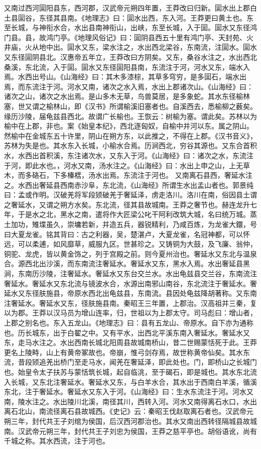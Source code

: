 \documentclass[12pt,UTF8]{ctexbook}
\begin{document}
又南过西河圁阳县东，西河郡，汉武帝元朔四年置，王莽改曰归新。圁水出上郡白土县圁谷，东径其县南。《地理志》曰：圁水出西，东入河。王莽更曰黄土也。东至长城，与神衔水合，水出县南神衔山，出峡，东至长城，入于圁。圁水又东径鸿门县。县，故鸿门亭。《地理风俗记》曰：圁阴县西五十里有鸿门亭、天封苑、火井庙，火从地中出。圁水又东，梁水注之，水出西北梁谷，东南流，注圁水。圁水又东径圁阴县北。汉惠帝五年立，王莽改曰方阴矣。又东，桑谷水注之，水出西北桑溪，东北流，入于圁。圁水又东径圁阳县南，东流注于河，河水又东，端水入焉。水西出号山。《山海经》曰：其木多漆棕，其草多穹穷，是多圁石，端水出焉，而东流注于河。河水又南，诸次之水入焉，水出上郡诸次山。《山海经》曰：诸次之山，诸次之水出焉。是山多木无草，鸟兽莫居，是多象蛇。其水东径榆林塞，世又谓之榆林山，即《汉书》所谓榆溪旧塞者也。自溪西去，悉榆柳之薮矣。缘历沙陵，届龟兹县西北。故谓广长榆也。王恢云：树榆为塞。谓此矣。苏林以为榆中在上郡，非也。案《始皇本纪》，西北逐匈奴，自榆中并河以东。属之阴山。然榆中在金城东五十许里，阴山在朔方东，以此推之，不得在上郡。《汉书音义》，苏林为失是也。其水东入长城，小榆水合焉。历涧西北，穷谷其源也。又东合首积水，水西出首积溪，东注诸次水，又东入于河。《山海经》曰：诸次之水，东流注于河，即此水也。，河水又南，汤水注之。《山海经》曰：水出上申之山，上无草木，而多硌石，下多榛楛，汤水出焉。东流注于河也。
又南离石县西，奢延水注之。水西出奢延县西南赤沙阜，东北流，《山海经》所谓生水出孟山者也。郭景纯曰：孟或作明。汉破羌将军段颎破羌于奢延泽，虏走洛川。洛川在南，俗因县土谓之奢延水，又谓之朔方水矣。东北流，径其县故城南。王莽之奢节也。赫连龙升七年，于是水之北，黑水之南，遣将作大匠梁公叱干阿利改筑大城，名曰统万城。蒸土加功，雉堞虽久，崇墉若新，并造五兵，器锐精利，乃咸百炼，为龙雀大鐶，号曰大夏龙雀。铭其背曰：古之利器，吴，楚湛卢，大夏龙雀，名冠神都，可以怀远，可以柔逋，如风靡草，威服九区。世甚珍之。又铸铜为大鼓，及飞廉、翁仲，铜驼、龙虎，皆以黄金饰之，列于宫殿之前。则今夏州治也。奢延水又东北与温泉合。源西北出沙溪，而东南流注奢延水。奢延水又东，黑水入焉。水出奢延县黑涧，东南历沙陵，注奢延水。奢延水又东台交兰水。水出龟兹县交兰谷，东南流注奢延水。奢延水又东北流与镜波水合，水源出南邪山南谷，东北流注于奢延水。奢延水又东径肤施县，帝原水西北出龟兹县，东南流。县因处龟兹降胡著称。又东南注奢延水。奢延水又东，径肤施县南。秦昭王三年置，上郡治。汉高祖并三秦，复以为郡。王莽以汉马员为增山连率，归，世祖以为上郡太守。司马彪曰：增山者，上郡之别名也。东入五龙山。《地理志》曰：县有五龙山、帝原水。自下亦为通称也。历长城东，出于白翟之中。又有平水，出西北平溪东南入奢延水。奢延水又东，走马水注之。水出西南长城北阳周县故城南桥山，昔二世赐蒙恬死于此。王莽更名上陵畤，山上有黄帝冢故也。帝崩，惟弓剑存焉，故世称黄帝仙矣。其水东流，昔段颎追羌出桥门至走马水，闻羌在奢延泽，即此处也。门，即桥山之长城门也。始皇令太子扶苏与蒙恬筑长城，起自临洮，至于碣石，即是城也。其水东北流入长城，又东北注奢延水。奢延水又东，与白羊水合，其水出于西南白羊溪，循溪东北，注于奢延水。奢延水又东入于河。《山海经》曰：生水东流注于河。河水又南，陵水注之。水出陵川北溪，南径其川，西转入河。河水又南得离石水口，水出离石北山，南流径离石县故城西。《史记》云：秦昭王伐赵取离石者也。汉武帝元朔三年，封代共王子刘绾为侯国，后汉西河郡治也。其水又南出西转径隔城县故城南。汉武帝元朔三年，封代共王子刘忠为侯国，王莽之慈平亭也。胡俗语讹，尚有千城之称。其水西流，注于河也。
\end{document}
